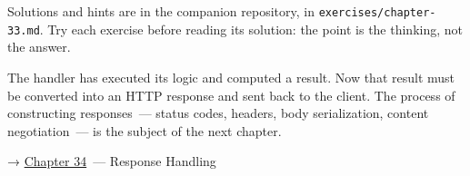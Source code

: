 \noindent{}Solutions and hints are in the companion repository, in \texttt{exercises/}\allowbreak{}\texttt{chapter-33.md}. Try each exercise before reading its solution: the point is the thinking, not the answer.

\label{33-logic-execution:whats-next}

The handler has executed its logic and computed a result. Now that result must be converted into an HTTP response and sent back to the client. The process of constructing responses~--- status codes, headers, body serialization, content negotiation~--- is the subject of the next chapter.

\noindent{}→ \hyperref[ch:34-response-handling]{Chapter 34}~--- Response Handling
